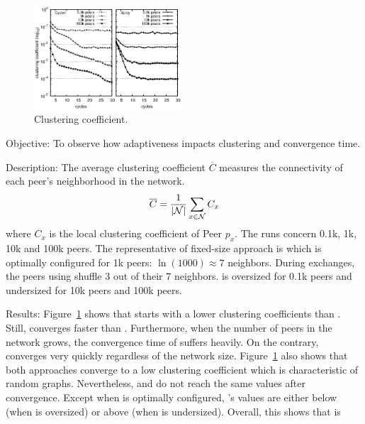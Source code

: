 \begin{figure}
  \centering
  \includegraphics[width=0.49\textwidth]{img/simple.eps}
  \caption{\label{fig:clustering}Clustering coefficient.}
\end{figure}

\begin{asparadesc}
\item[Objective:] To observe how adaptiveness impacts clustering and convergence
  time.
\item[Description:] The average clustering coefficient $\overline{C}$ measures
  the connectivity of each peer's neighborhood in the network.
  \begin{equation}
    \overline{C} = {1\over |\mathcal{N}|}\sum\limits_{x\in\mathcal{N}}C_x
  \end{equation}
  where $C_x$ is the local clustering coefficient of Peer $p_x$.  The runs
  concern 0.1k, 1k, 10k and 100k peers. The representative of fixed-size
  approach is \CYCLON which is optimally configured for 1k peers:
  $\ln(1000)\approx 7$ neighbors. During exchanges, the peers using \CYCLON
  shuffle $3$ out of their $7$ neighbors. \CYCLON is oversized for 0.1k peers
  and undersized for 10k peers and 100k peers.
\item[Results:] Figure~\ref{fig:clustering} shows that \CYCLON starts
  with a lower clustering coefficients than \SPRAY. Still, \SPRAY
  converges faster than \CYCLON. Furthermore, when the number of peers
  in the network grows, the convergence time of \CYCLON suffers
  heavily. On the contrary, \SPRAY converges very quickly
  regardless of the network size. Figure~\ref{fig:clustering} also
  shows that both approaches converge to a low clustering coefficient
  which is characteristic of random graphs. Nevertheless, \CYCLON and
  \SPRAY do not reach the same values after convergence. Except when
  \CYCLON is optimally configured, \SPRAY's values are either below
  (when \CYCLON is oversized) or above (when \CYCLON is undersized).
  Overall, this shows that \SPRAY is
  \begin{inparaenum}

\end{inparaenum}
\end{asparadesc}
